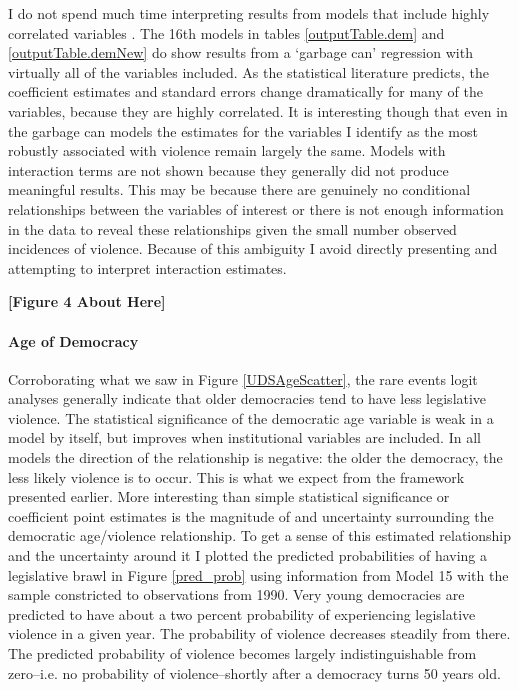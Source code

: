 \documentclass[a4paper]{article}\usepackage{graphicx, color}
\begin{document}
{{I do not spend much time interpreting results from models that include highly correlated variables \citep[see][]{Achen2002, Schrodt2006}. The 16th models in tables \ref{outputTable.dem} and \ref{outputTable.demNew} do show results from a `garbage can' regression with virtually all of the variables included. As the statistical literature predicts, the coefficient estimates and standard errors change dramatically for many of the variables, because they are highly correlated. It is interesting though that even in the garbage can models the estimates for the variables I identify as the most robustly associated with violence remain largely the same. Models with interaction terms are not shown because they generally did not produce meaningful results. This may be because there are genuinely no conditional relationships between the variables of interest or there is not enough information in the data to reveal these relationships given the small number observed incidences of violence. Because of this ambiguity I avoid directly presenting and attempting to interpret interaction estimates. 

\begin{center}

{\bf{[Figure 4 About Here]}}

\end{center}

\paragraph{Age of Democracy}
Corroborating what we saw in Figure \ref{UDSAgeScatter}, the rare events logit analyses generally indicate that older democracies tend to have less legislative violence. The statistical significance of the democratic age variable is weak in a model by itself, but improves when institutional variables are included. In all models the direction of the relationship is negative: the older the democracy, the less likely violence is to occur. This is what we expect from the framework presented earlier. More interesting than simple statistical significance or coefficient point estimates is the magnitude of and uncertainty surrounding the democratic age/violence relationship. To get a sense of this estimated relationship and the uncertainty around it \citep[see][]{King2000} I plotted the predicted probabilities of having a legislative brawl in Figure \ref{pred_prob} using information from Model 15 with the sample constricted to observations from 1990. Very young democracies are predicted to have about a two percent probability of experiencing legislative violence in a given year. The probability of violence decreases steadily from there. The predicted probability of violence becomes largely indistinguishable from zero--i.e. no probability of violence--shortly after a democracy turns 50 years old.

}}
\end{document}
